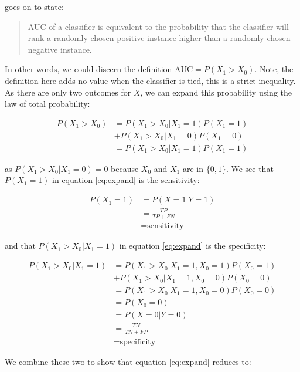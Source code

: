 \documentclass[article]{jss}
\begin{document}
\citet{fawcett2006introduction} goes on to state:

\begin{quote}
AUC of a classifier is equivalent to the probability that the classifier
will rank a randomly chosen positive instance higher than a randomly
chosen negative instance.
\end{quote}

In other words, we could discern the definition
\(\text{AUC} = P(X_{1} > X_{0})\). Note, the definition here adds no
value when the classifier is tied, this is a strict inequality. As there
are only two outcomes for \(X\), we can expand this probability using
the law of total probability:

\begin{align}
P(X_{1} > X_{0}) &= P(X_{1} > X_{0} | X_{1} = 1) P(X_{1} = 1) \nonumber \\
&+ P(X_{1} > X_{0} | X_{1} = 0) P(X_{1} = 0) \label{eq:expand1} \\
&= P(X_{1} > X_{0} | X_{1} = 1) P(X_{1} = 1) \label{eq:expand}
\end{align}

as \(P(X_{1} > X_{0} | X_{1} = 0) = 0\) because \(X_{0}\) and \(X_{1}\)
are in \(\{0, 1\}\). We see that \(P(X_{1} = 1)\) in equation
\eqref{eq:expand} is the sensitivity:

\begin{align*}
P(X_{1} = 1) &= P(X = 1 | Y = 1)\\
&= \frac{TP}{TP + FN} \\
&= \text{sensitivity}
\end{align*}

and that \(P(X_{1} > X_{0} | X_{1} = 1)\) in equation \eqref{eq:expand}
is the specificity:

\begin{align*}
P(X_{1} > X_{0} | X_{1} = 1) &= P(X_{1} > X_{0} | X_{1} = 1, X_{0} =1) P(X_{0} = 1) \\
&+ P(X_{1} > X_{0} | X_{1} = 1, X_{0} =0) P(X_{0} = 0) \\
&= P(X_{1} > X_{0} | X_{1} = 1, X_{0} =0) P(X_{0} = 0) \\
&= P(X_{0} = 0) \\
&= P(X = 0 | Y = 0)\\
&= \frac{TN}{TN + FP} \\
&= \text{specificity}
\end{align*}

We combine these two to show that equation \eqref{eq:expand} reduces to:
\end{document}
